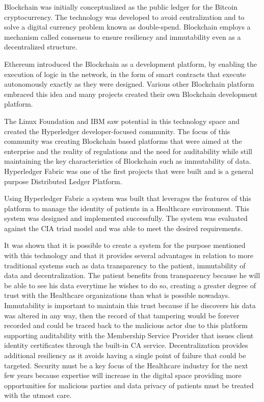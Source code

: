 Blockchain was initially conceptualized as the public ledger for the Bitcoin
cryptocurrency. The technology was developed to avoid centralization and to
solve a digital currency problem known as double-spend. Blockchain employs a
mechanism called consensus to ensure resiliency and immutability even as a
decentralized structure.

Ethereum introduced the Blockchain as a development platform, by enabling the
execution of logic in the network, in the form of smart contracts that execute
autonomously exactly as they were designed. Various other Blockchain platform
embraced this idea and many projects created their own Blockchain development
platform.

The Linux Foundation and IBM saw potential in this technology space and created
the Hyperledger developer-focused community. The focus of this community was
creating Blockchain based platforms that were aimed at the enterprise and the
reality of regulations and the need for auditability while still maintaining
the key characteristics of Blockchain such as immutability of data. Hyperledger
Fabric was one of the first projects that were built and is a general purpose
Distributed Ledger Platform.

Using Hyperledger Fabric a system was built that leverages the features of this
platform to manage the identity of patients in a Healthcare environment. This
system was designed and implemented successfully. The system was evaluated
against the CIA triad model and was able to meet the desired requirements.

It was shown that it is possible to create a system for the purpose mentioned
with this technology and that it provides several advantages in relation to
more traditional systems such as data transparency to the patient, immutability
of data and decentralization. The patient benefits from transparency because he
will be able to see his data everytime he wishes to do so, creating a greater
degree of trust with the Healthcare organizations than what is possible
nowadays. Immutability is important to maintain this trust because if he
discovers his data was altered in any way, then the record of that tampering
would be forever recorded and could be traced back to the malicious actor due
to this platform supporting auditability with the Membership Service Provider
that issues client identity certificates through the built-in CA service.
Decentralization provides additional resiliency as it avoids having a single
point of failure that could be targeted. Security must be a key focus of the
Healthcare industry for the next few years because expertise will increase in
the digital space providing more opportunities for malicious parties and data
privacy of patients must be treated with the utmost care.

